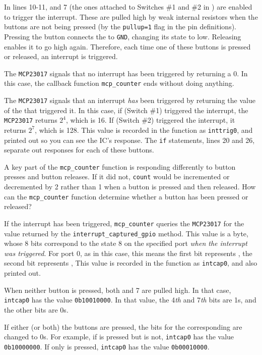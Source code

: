 In lines 10-11,  and 7 (the ones attached to Switches \#1 and \#2 in ) are enabled to trigger the interrupt.
These \gpios are pulled high by weak internal resistors when the buttons are not being pressed (by the \lstinline{pullup=1} flag in the pin definitions).
Pressing the button connects the \gpio to \texttt{GND}, changing its state to low.
Releasing enables it to go high again.
Therefore, each time one of these buttons is pressed or released, an interrupt is triggered.

The \texttt{MCP23017} signals that no interrupt has been triggered by returning a 0.
In this case, the callback function \lstinline{mcp_counter} ends without doing anything.

The \texttt{MCP23017} signals that an interrupt \emph{has} been triggered by returning the value of the \gpio that triggered it.
In this case, if  (Switch \#1) triggered the interrupt, the \texttt{MCP23017} returns $2^4$, which is 16.
If  (Switch \#2) triggered the interrupt, it returns $2^7$, which is 128.
This value is recorded in the function as \lstinline{inttrig0}, and printed out so you can see the IC's response.
The \texttt{if} statements, lines 20 and 26, separate out responses for each of these buttons.

A key part of the \lstinline{mcp_counter} function is responding differently to button presses and button releases.
If it did not, \texttt{count} would be incremented or decremented by 2 rather than 1 when a button is pressed and then released.
How can the \lstinline{mcp_counter} function determine whether a button has been pressed or released?

If the interrupt has been triggered, \lstinline{mcp_counter} queries the \texttt{MCP23017} for the value returned by the \lstinline{interrupt_captured_gpio} method.
This value is a byte, whose 8 bits correspond to the state 8 \gpios on the specified port \emph{when the interrupt was triggered}.
For port 0, as in this case, this means the first bit represents , the second bit represents , \etc
This value is recorded in the function as \lstinline{intcap0}, and also printed out.

When neither button is pressed, both  and 7 are pulled high.
In that case, \lstinline{intcap0} has the value \lstinline{0b10010000}.
In that value, the 4\textit{th} and 7\textit{th} bits are 1s, and the other bits are 0s.

If either (or both) the buttons are pressed, the bits for the corresponding \gpios are changed to 0s.
For example, if  is pressed but  is not, \lstinline{intcap0} has the value \lstinline{0b10000000}.
If only  is pressed, \lstinline{intcap0} has the value \lstinline{0b00010000}.

